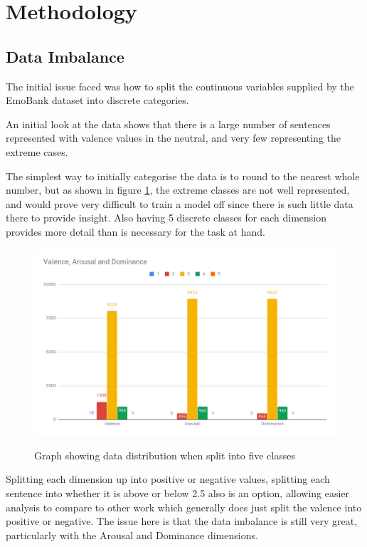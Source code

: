    
\section{Methodology}
\subsection{Data Imbalance}

The initial issue faced was how to split the continuous variables supplied by the EmoBank dataset into discrete categories.

An initial look at the data shows that there is a large number of sentences represented with valence values in the neutral, and very few representing the extreme cases. 


The simplest way to initially categorise the data is to round to the nearest whole number, but as shown in figure \ref{dist:5cat}, the extreme classes are not well represented, and would prove very difficult to train a model off since there is such little data there to provide insight. Also having 5 discrete classes for each dimension provides more detail than is necessary for the task at hand.


\begin{figure}[h]
\caption{Graph showing data distribution when split into five classes}
\centering
\includegraphics[scale=0.3]{graphs/5catDist.png}
\label{dist:5cat}
\end{figure}

Splitting each dimension up into positive or negative values, splitting each sentence into whether it is above or below 2.5 also is an option, allowing easier analysis to compare to other work which generally does just split the valence into positive or negative. The issue here is that the data imbalance is still very great, particularly with the Arousal and Dominance dimensions.

